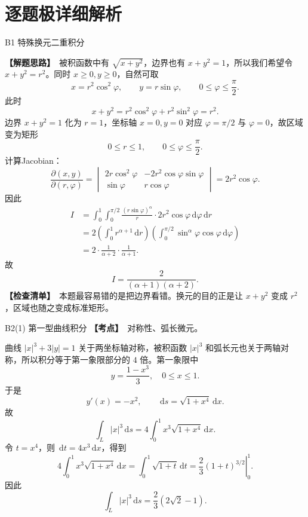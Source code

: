 \documentclass[UTF8,zihao=-4,openany]{ctexbook}
\newcommand{\dd}{\,\mathrm{d}}
\newcommand{\thinking}{\textcolor{mainblue}{\bfseries【解题思路】}}
\newcommand{\point}{\textcolor{warnred}{\bfseries【考点】}}
\newcommand{\checklist}{\textcolor{theogreen}{\bfseries【检查清单】}}
\begin{document}
\section*{逐题极详细解析}
\begin{solutionbox}{B1 特殊换元二重积分}

\thinking\ 被积函数中有 $\sqrt{x+y^2}$，边界也有 $x+y^2=1$，所以我们希望令 $x+y^2=r^2$。同时 $x\ge0,y\ge0$，自然可取
\[
x=r^2\cos^2\varphi,
\qquad
y=r\sin\varphi,
\qquad
0\le\varphi\le\frac\pi2.
\]
此时
\[
x+y^2=r^2\cos^2\varphi+r^2\sin^2\varphi=r^2.
\]
边界 $x+y^2=1$ 化为 $r=1$，坐标轴 $x=0,y=0$ 对应 $\varphi=\pi/2$ 与 $\varphi=0$，故区域变为矩形
\[
0\le r\le1,
\qquad
0\le\varphi\le\frac\pi2.
\]
计算Jacobian：
\[
\frac{\partial(x,y)}{\partial(r,\varphi)}=
\begin{vmatrix}
2r\cos^2\varphi&-2r^2\cos\varphi\sin\varphi\\
\sin\varphi&r\cos\varphi
\end{vmatrix}
=2r^2\cos\varphi.
\]
因此
\[
\begin{aligned}
I&=\int_0^1\int_0^{\pi/2}
\frac{(r\sin\varphi)^\alpha}{r}\cdot 2r^2\cos\varphi\dd\varphi\dd r\\
&=2\left(\int_0^1r^{\alpha+1}\dd r\right)
\left(\int_0^{\pi/2}\sin^\alpha\varphi\cos\varphi\dd\varphi\right)\\
&=2\cdot\frac1{\alpha+2}\cdot\frac1{\alpha+1}.
\end{aligned}
\]
故
\[
\boxed{I=\frac{2}{(\alpha+1)(\alpha+2)}}.
\]
\checklist\ 本题最容易错的是把边界看错。换元的目的正是让 $x+y^2$ 变成 $r^2$，区域也随之变成标准矩形。
\end{solutionbox}

\begin{solutionbox}{B2(1) 第一型曲线积分}
\point\ 对称性、弧长微元。

曲线 $|x|^3+3|y|=1$ 关于两坐标轴对称，被积函数 $|x|^3$ 和弧长元也关于两轴对称，所以积分等于第一象限部分的 $4$ 倍。第一象限中
\[
y=\frac{1-x^3}{3},\quad 0\le x\le1.
\]
于是
\[
y'(x)=-x^2,
\qquad
\dd s=\sqrt{1+x^4}\dd x.
\]
故
\[
\int_L|x|^3\dd s=4\int_0^1x^3\sqrt{1+x^4}\dd x.
\]
令 $t=x^4$，则 $\dd t=4x^3\dd x$，得到
\[
4\int_0^1x^3\sqrt{1+x^4}\dd x=
\int_0^1\sqrt{1+t}\dd t
=\left.\frac{2}{3}(1+t)^{3/2}\right|_0^1.
\]
因此
\[
\boxed{\int_L|x|^3\dd s=\frac23(2\sqrt2-1)}.
\]
\end{solutionbox}
\end{document}
